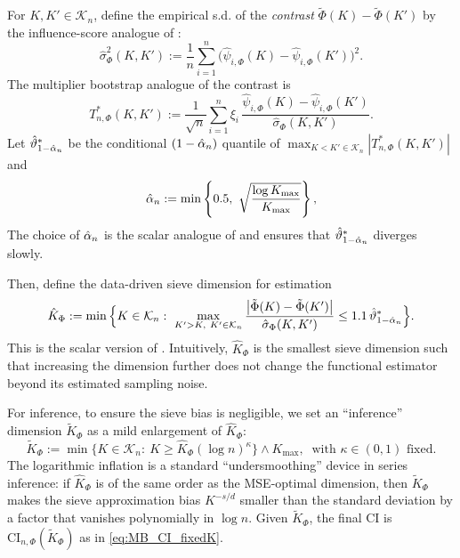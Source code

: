 \documentclass[12pt,american]{article}
\theoremstyle{definition}
\theoremstyle{plain}
\theoremstyle{definition}
\theoremstyle{plain}
\theoremstyle{plain}
\theoremstyle{plain}
\theoremstyle{plain}
\theoremstyle{plain}
\newcommand{\abs}[1]{\left| #1 \right|}
\begin{document}
For $K,K'\in\mathcal K_n$, define the empirical s.d. of the \emph{contrast}
$\tilde{\Phi}(K)-\tilde{\Phi}(K')$ by the influence-score analogue of
\citet*[][eq.\ (9)]{chen2025adaptive}:
\begin{equation}
  \hat\sigma_{\Phi}^2(K,K')
  :=\frac1n\sum_{i=1}^n \big(\hat\psi_{i,\Phi}(K)-\hat\psi_{i,\Phi}(K')\big)^2.
  \label{eq:MB_sigma_contrast}
\end{equation}
The multiplier bootstrap analogue of the contrast is
\begin{equation}
  T_{n,\Phi}^*(K,K')
  :=\frac{1}{\sqrt n}\sum_{i=1}^n \xi_i\,\frac{\hat\psi_{i,\Phi}(K)-\hat\psi_{i,\Phi}(K')}{\hat\sigma_{\Phi}(K,K')}.
  \label{eq:MB_contrast_star}
\end{equation}
Let $ \hat\vartheta_{1-\hat{\alpha}_n}^*$ be the conditional $(1-\hat{\alpha}_n)$ quantile of
  $\max_{K<K'\in\mathcal K_n}\abs{T_{n,\Phi}^*(K,K')}$ and
\begin{equation}\label{eq:MB_theta_quantile}
  \hat{\alpha}_n:=\min\left\{0.5,\ \sqrt{\frac{\log K_{\max}}{K_{\max}}}\right\},
\end{equation}
The choice of $\hat{\alpha}_n$ is the scalar analogue of
\citet*[][Step~2 of Procedure~1]{chen2025adaptive} and ensures that
$\hat\vartheta_{1-\hat{\alpha}_n}^*$ diverges slowly.

Then, define the data-driven sieve dimension for estimation
\begin{equation}
  \hat K_{\Phi}
  :=\min\Big\{K\in\mathcal K_n:\ \max_{K'>K,\ K'\in\mathcal K_n}
    \frac{\abs{\tilde{\Phi}(K)-\tilde{\Phi}(K')}}{\hat\sigma_{\Phi}(K,K')}
  \le 1.1\,\hat\vartheta_{1-\hat\a_n}^*\Big\}.
  \label{eq:MB_Khat}
\end{equation}
This is the scalar version of \citet*[][Step~3 of Procedure~1]{chen2025adaptive}.
Intuitively, $\hat K_{\Phi}$ is the smallest sieve dimension such that increasing the dimension further does not change the functional estimator beyond its estimated sampling noise.

For inference, to ensure the sieve bias is negligible,
we set an ``inference'' dimension $\tilde K_{\Phi}$ as a mild enlargement of $\hat K_{\Phi}$:
\begin{equation}
  \tilde K_{\Phi}
  :=\min\Big\{K\in\mathcal K_n:\ K\ge \hat K_{\Phi}(\log n)^{\kappa}\Big\}\wedge K_{\max},\
  \text{ with } \kappa\in (0,1) \text{ fixed.}
  \label{eq:MB_Ktilde}
\end{equation}
The logarithmic inflation is a standard ``undersmoothing'' device in series inference:
if $\hat K_{\Phi}$ is of the same order as the MSE-optimal dimension, then $\tilde K_{\Phi}$ makes
the sieve approximation bias $K^{-s/d}$ smaller than the standard deviation by a factor that vanishes polynomially in $\log n$. Given $\tilde K_{\Phi}$, the final CI is $\mathrm{CI}_{n,\Phi}(\tilde K_{\Phi})$ as in \eqref{eq:MB_CI_fixedK}.
\end{document}
